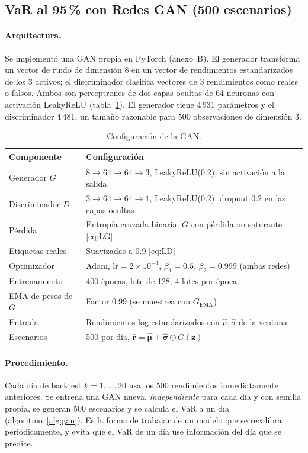 \documentclass[12pt,letterpaper]{article}
\begin{document}
\subsection{VaR al 95\,\% con Redes GAN (500 escenarios)}\label{sec:gan}

\paragraph{Arquitectura.}
Se implementó una GAN propia en PyTorch (anexo~B). El generador transforma un vector de ruido de dimensión 8 en un vector de rendimientos estandarizados de los 3 activos; el discriminador clasifica vectores de 3 rendimientos como reales o falsos. Ambos son perceptrones de dos capas ocultas de 64 neuronas con activación LeakyReLU (tabla~\ref{tab:gan}). El generador tiene 4\,931 parámetros y el discriminador 4\,481, un tamaño razonable para 500 observaciones de dimensión 3.

\begin{table}[H]
\centering
\renewcommand{\arraystretch}{1.2}
\begin{tabular}{@{}ll@{}}
\toprule
\textbf{Componente} & \textbf{Configuración}\\
\midrule
Generador $G$ & $8\to64\to64\to3$, LeakyReLU(0.2), sin activación a la salida\\
Discriminador $D$ & $3\to64\to64\to1$, LeakyReLU(0.2), dropout 0.2 en las capas ocultas\\
Pérdida & Entropía cruzada binaria; $G$ con pérdida no saturante \eqref{eq:LG}\\
Etiquetas reales & Suavizadas a 0.9 \eqref{eq:LD}\\
Optimizador & Adam, $\text{lr}=2\times10^{-4}$, $\beta_1=0.5$, $\beta_2=0.999$ (ambas redes)\\
Entrenamiento & 400 épocas, lote de 128, 4 lotes por época\\
EMA de pesos de $G$ & Factor 0.99 (se muestrea con $G_{\text{EMA}}$)\\
Entrada & Rendimientos log estandarizados con $\hat\mu,\hat\sigma$ de la ventana\\
Escenarios & 500 por día, $\hat{\mathbf r}=\hat{\bm\mu}+\hat{\bm\sigma}\odot G(\mathbf z)$\\
\bottomrule
\end{tabular}
\caption{Configuración de la GAN.}\label{tab:gan}
\end{table}

\paragraph{Procedimiento.}
Cada día de backtest $k=1,\dots,20$ usa los 500 rendimientos inmediatamente anteriores. Se entrena una GAN nueva, \emph{independiente} para cada día y con semilla propia, se generan 500 escenarios y se calcula el VaR a un día (algoritmo~\ref{alg:gan}). Es la forma de trabajar de un modelo que se recalibra periódicamente, y evita que el VaR de un día use información del día que se predice.
\end{document}
